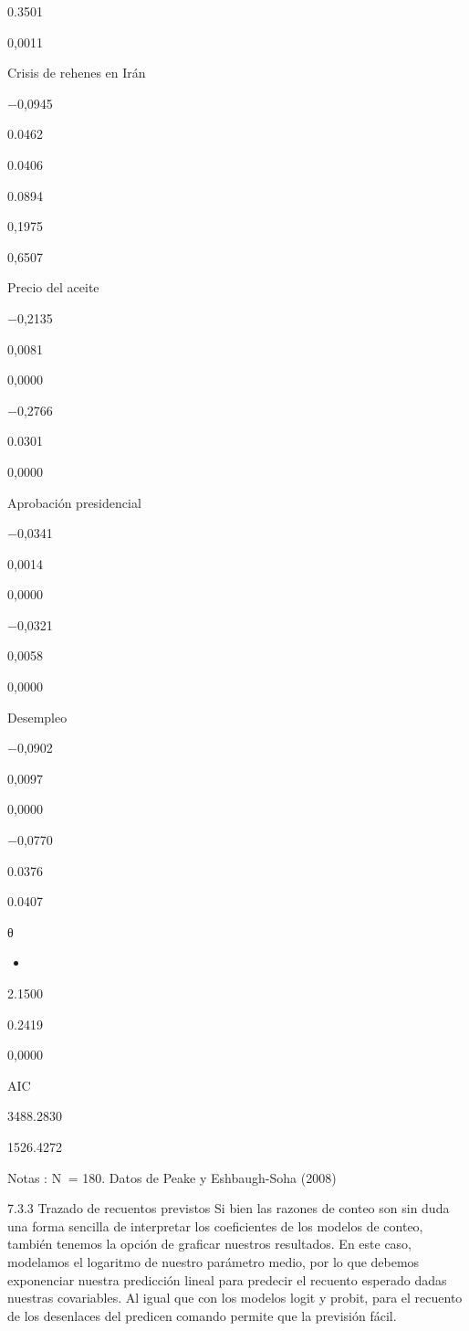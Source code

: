 \documentclass[
]{book}
\providecommand{\tightlist}{%
  \setlength{\itemsep}{0pt}\setlength{\parskip}{0pt}}
\begin{document}
0.3501

0,0011

Crisis de rehenes en Irán

−0,0945

0.0462

0.0406

0.0894

0,1975

0,6507

Precio del aceite

−0,2135

0,0081

0,0000

−0,2766

0.0301

0,0000

Aprobación presidencial

−0,0341

0,0014

0,0000

−0,0321

0,0058

0,0000

Desempleo

−0,0902

0,0097

0,0000

−0,0770

0.0376

0.0407

θ

\begin{itemize}
\tightlist
\item
\end{itemize}

2.1500

0.2419

0,0000

AIC

3488.2830

1526.4272

Notas : N  = 180. Datos de Peake y Eshbaugh-Soha (2008)

7.3.3 Trazado de recuentos previstos
Si bien las razones de conteo son sin duda una forma sencilla de interpretar los coeficientes de los modelos de conteo, también tenemos la opción de graficar nuestros resultados. En este caso, modelamos el logaritmo de nuestro parámetro medio, por lo que debemos exponenciar nuestra predicción lineal para predecir el recuento esperado dadas nuestras covariables. Al igual que con los modelos logit y probit, para el recuento de los desenlaces del predicen comando permite que la previsión fácil.
\end{document}
